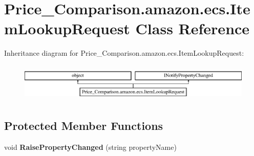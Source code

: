 \hypertarget{class_price___comparison_1_1amazon_1_1ecs_1_1_item_lookup_request}{\section{Price\-\_\-\-Comparison.\-amazon.\-ecs.\-Item\-Lookup\-Request Class Reference}
\label{class_price___comparison_1_1amazon_1_1ecs_1_1_item_lookup_request}
}


 


Inheritance diagram for Price\-\_\-\-Comparison.\-amazon.\-ecs.\-Item\-Lookup\-Request\-:\begin{figure}[H]
\begin{center}
\leavevmode
\includegraphics[height=1.830065cm]{class_price___comparison_1_1amazon_1_1ecs_1_1_item_lookup_request}
\end{center}
\end{figure}
\subsection*{Protected Member Functions}
\begin{DoxyCompactItemize}
\item 
\hypertarget{class_price___comparison_1_1amazon_1_1ecs_1_1_item_lookup_request_aa43a5ac5367822c85028ed105ea1a457}{void {\bfseries Raise\-Property\-Changed} (string property\-Name)}\label{class_price___comparison_1_1amazon_1_1ecs_1_1_item_lookup_request_aa43a5ac5367822c85028ed105ea1a457}

\end{DoxyCompactItemize}
